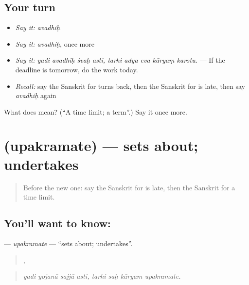 \subsection*{Your turn}
\begin{itemize}
\raggedright
  \item \emph{Say it:} \emph{avadhiḥ}
  \item \emph{Say it:} \emph{avadhiḥ}, once more
  \item \emph{Say it:} \emph{yadi avadhiḥ śvaḥ asti, tarhi adya eva kāryaṃ karotu.} — If the deadline is tomorrow, do the work today.
  \item \emph{Recall:} say the Sanskrit for turns back, then the Sanskrit for is late, then say \emph{avadhiḥ} again
\end{itemize}

\begin{tcolorbox}[breakable,colback=teal!4,colframe=teal!35!black,title={Before you move on}]
What does  mean? (\textquotedblleft{}A time limit; a term\textquotedblright{}.) Say it once more.
\end{tcolorbox}
\section[\texorpdfstring{\sk{उपक्रमते} (upakramate)}{उपक्रमते (upakramate)}]{ (upakramate) — sets about; undertakes}

\label{lesson:SA-C371-upakramate}



\begin{quote}
Before the new one: say the Sanskrit for is late, then the Sanskrit for a time limit.
\end{quote}

\subsection*{You'll want to know: }
\textbf{} — \emph{upakramate} — \textquotedblleft{}sets about; undertakes\textquotedblright{}.

\begin{quote}
   ,    
\end{quote}

\begin{quote}
\emph{yadi yojanā sajjā asti, tarhi saḥ kāryam upakramate.}
\end{quote}

